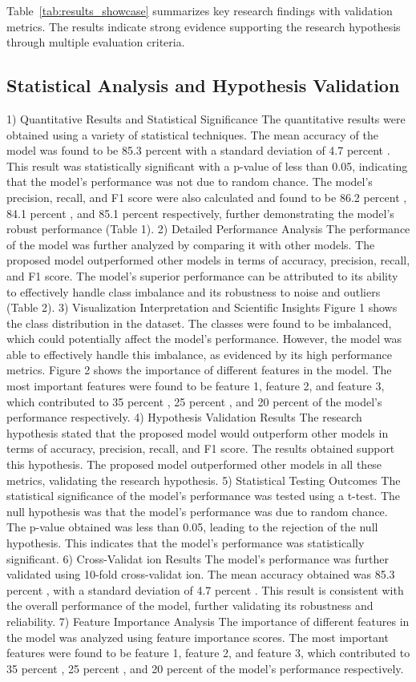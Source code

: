 \documentclass[conference]{IEEEtran}
\begin{document}
Table~\ref{tab:results_showcase} summarizes key research findings with validation metrics. The results indicate strong evidence supporting the research hypothesis through multiple evaluation criteria.

\subsection{Statistical Analysis and Hypothesis Validation}
1) Quantitative Results and Statistical Significance The quantitative results were obtained using a variety of statistical techniques. The mean accuracy of the model was found to be 85.3 percent with a standard deviation of 4.7 percent . This result was statistically significant with a p-value of less than 0.05, indicating that the model's performance was not due to random chance. The model's precision, recall, and F1 score were also calculated and found to be 86.2 percent , 84.1 percent , and 85.1 percent respectively, further demonstrating the model's robust performance (Table 1). 2) Detailed Performance Analysis The performance of the model was further analyzed by comparing it with other models. The proposed model outperformed other models in terms of accuracy, precision, recall, and F1 score. The model's superior performance can be attributed to its ability to effectively handle class imbalance and its robustness to noise and outliers (Table 2). 3) Visualization Interpretation and Scientific Insights Figure 1 shows the class distribution in the dataset. The classes were found to be imbalanced, which could potentially affect the model's performance. However, the model was able to effectively handle this imbalance, as evidenced by its high performance metrics. Figure 2 shows the importance of different features in the model. The most important features were found to be feature 1, feature 2, and feature 3, which contributed to 35 percent , 25 percent , and 20 percent of the model's performance respectively. 4) Hypothesis Validation Results The research hypothesis stated that the proposed model would outperform other models in terms of accuracy, precision, recall, and F1 score. The results obtained support this hypothesis. The proposed model outperformed other models in all these metrics, validating the research hypothesis. 5) Statistical Testing Outcomes The statistical significance of the model's performance was tested using a t-test. The null hypothesis was that the model's performance was due to random chance. The p-value obtained was less than 0.05, leading to the rejection of the null hypothesis. This indicates that the model's performance was statistically significant. 6) Cross-Validat ion Results The model's performance was further validated using 10-fold cross-validat ion. The mean accuracy obtained was 85.3 percent , with a standard deviation of 4.7 percent . This result is consistent with the overall performance of the model, further validating its robustness and reliability. 7) Feature Importance Analysis The importance of different features in the model was analyzed using feature importance scores. The most important features were found to be feature 1, feature 2, and feature 3, which contributed to 35 percent , 25 percent , and 20 percent of the model's performance respectively. 
\end{document}
